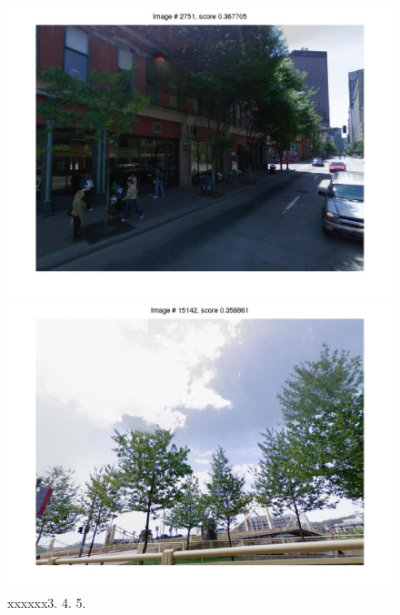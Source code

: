 \documentclass[10pt,onecolumn,A4]{article}
\begin{document}
\begin{figure}
\begin{minipage}{0.45\linewidth}
		\colorbox{myCopper4}{\includegraphics[trim = 55mm 40mm 55mm 30mm, clip=true,width=0.30\linewidth]{sup2959/svm04.jpg}}
		\colorbox{myCopper5}{\includegraphics[trim = 55mm 40mm 55mm 30mm, clip=true,width=0.30\linewidth]{sup2959/svm05.jpg}}  \\
		\textcolor{myWhite}{xxxxxx}3. \hspace{0.25\linewidth}4. \hspace{0.25\linewidth}5. \\
	\end{minipage}
\end{figure}
\end{document}

